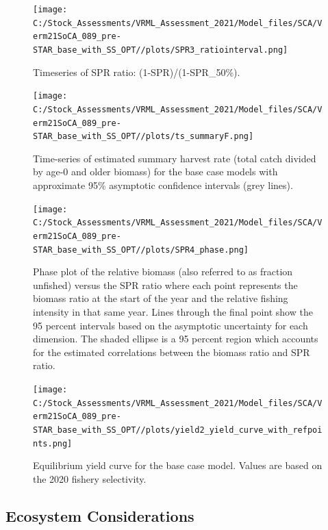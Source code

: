 \documentclass[11pt,
  english,
  a4paper,
]{article}
\begin{document}
\begin{figure}
\centering
\texttt{[image: C:/Stock\_Assessments/VRML\_Assessment\_2021/Model\_files/SCA/Verm21SoCA\_089\_pre-STAR\_base\_with\_SS\_OPT//plots/SPR3\_ratiointerval.png]}
\caption{Timeseries of SPR ratio: (1-SPR)/(1-SPR\_50\%).\label{fig:1-sprES}}
\end{figure}

\begin{figure}
\centering
\texttt{[image: C:/Stock\_Assessments/VRML\_Assessment\_2021/Model\_files/SCA/Verm21SoCA\_089\_pre-STAR\_base\_with\_SS\_OPT//plots/ts\_summaryF.png]}
\caption{Time-series of estimated summary harvest rate (total catch divided by age-0 and older biomass) for the base case models with approximate 95\% asymptotic confidence intervals (grey lines).\label{fig:FmortalityES}}
\end{figure}

\begin{figure}
\centering
\texttt{[image: C:/Stock\_Assessments/VRML\_Assessment\_2021/Model\_files/SCA/Verm21SoCA\_089\_pre-STAR\_base\_with\_SS\_OPT//plots/SPR4\_phase.png]}
\caption{Phase plot of the relative biomass (also referred to as fraction unfished) versus the SPR ratio where each point represents the biomass ratio at the start of the year and the relative fishing intensity in that same year. Lines through the final point show the 95 percent intervals based on the asymptotic uncertainty for each dimension. The shaded ellipse is a 95 percent region which accounts for the estimated correlations between the biomass ratio and SPR ratio.\label{fig:phaseES}}
\end{figure}

\begin{figure}
\centering
\texttt{[image: C:/Stock\_Assessments/VRML\_Assessment\_2021/Model\_files/SCA/Verm21SoCA\_089\_pre-STAR\_base\_with\_SS\_OPT//plots/yield2\_yield\_curve\_with\_refpoints.png]}
\caption{Equilibrium yield curve for the base case model. Values are based on the 2020 fishery selectivity.\label{fig:yield2ES}}
\end{figure}

\FloatBarrier


\hypertarget{ecosystem-considerations}{%
\subsection*{Ecosystem Considerations}\label{ecosystem-considerations}}
\end{document}
